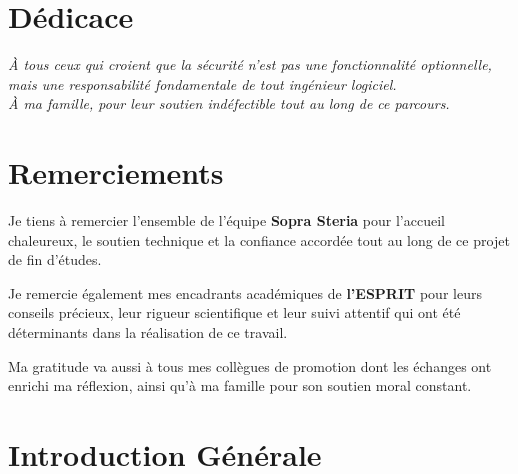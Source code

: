 \documentclass[12pt,a4paper]{./tpl/isipfe}
\begin{document}
    

    \frontmatter
    
    \dominitoc
    \setcounter{page}{1}

    \chapter*{Dédicace}
    \adjustmtc
    \thispagestyle{frontmatter}
    \begin{center}
        {\it
        À tous ceux qui croient que la sécurité n'est pas une fonctionnalité optionnelle,\\
        mais une responsabilité fondamentale de tout ingénieur logiciel.\\
        \vspace{1cm}
        À ma famille, pour leur soutien indéfectible tout au long de ce parcours.
        }
    \end{center}

    \chapter*{Remerciements}
    \adjustmtc
    \thispagestyle{frontmatter}

    Je tiens à remercier l'ensemble de l'équipe \textbf{Sopra Steria} pour l'accueil chaleureux,
    le soutien technique et la confiance accordée tout au long de ce projet de fin d'études.

    Je remercie également mes encadrants académiques de \textbf{l'ESPRIT} pour leurs conseils
    précieux, leur rigueur scientifique et leur suivi attentif qui ont été déterminants dans
    la réalisation de ce travail.

    Ma gratitude va aussi à tous mes collègues de promotion dont les échanges ont enrichi
    ma réflexion, ainsi qu'à ma famille pour son soutien moral constant.

    \setcounter{secnumdepth}{3}
    \setcounter{tocdepth}{2}
    \dominitoc
    \tableofcontents
    \adjustmtc
    \thispagestyle{frontmatter}

    \listoffigures
    \adjustmtc
    \thispagestyle{frontmatter}
    \listoftables
    \adjustmtc
    \thispagestyle{frontmatter}

    \mainmatter
    \chapter*{Introduction Générale}
    
    \clearpage
\end{document}
